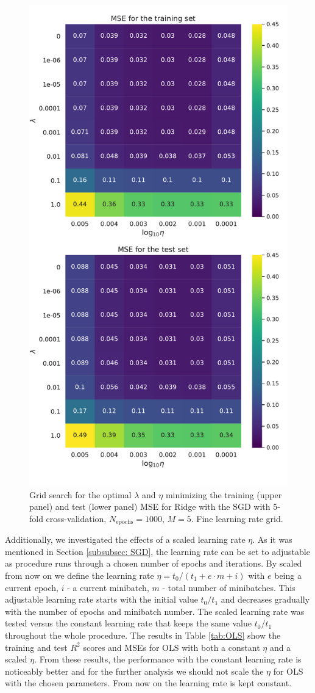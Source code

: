 \documentclass{emulateapj}
\begin{document}
\begin{figure}[h]
    \centering
    \includegraphics[width=.49\textwidth]{Figures/Ridge_MSE_fine.pdf}
    \caption{Grid search for the optimal $\lambda$ and $\eta$ minimizing the training (upper panel) and test (lower panel) MSE for Ridge with the SGD with 5-fold cross-validation, $N_{\mathrm{epochs}}=1000$, $M=5$. Fine learning rate grid.}
    \label{fig: Ridge_grid_MSE_fine}
\end{figure}

Additionally, we investigated the effects of a scaled learning rate $\eta$. As it was mentioned in Section \ref{subsubsec: SGD}, the learning rate can be set to adjustable as procedure runs through a chosen number of epochs and iterations. By scaled from now on we define the learning rate $\eta=t_0/(t_1+e\cdot m+i)$ with $e$ being a current epoch, $i$ - a current minibatch, $m$ - total number of minibatches. This adjustable learning rate starts with the initial value $t_0/t_1$ and decreases gradually with the number of epochs and minibatch number. The scaled learning rate was tested versus the constant learning rate that keeps the same value $t_0/t_1$ throughout the whole procedure. The results in Table \ref{tab:OLS} show the training and test $R^{2}$ scores and MSEs for OLS with both a constant $\eta$ and a scaled $\eta$. From these results, the performance with the constant learning rate is noticeably better and for the further analysis we should not scale the $\eta$ for OLS with the chosen parameters. From now on the learning rate is kept constant.
\end{document}
